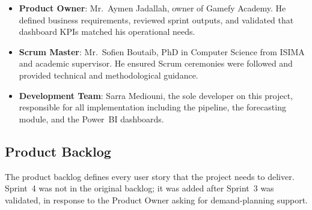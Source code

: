 \documentclass[12pt, a4paper]{report}
\begin{document}
\begin{itemize}
  \item \textbf{Product Owner}: Mr.\ Aymen Jadallah, owner of Gamefy Academy.
        He defined business requirements, reviewed sprint outputs, and validated
        that dashboard KPIs matched his operational needs.

  \item \textbf{Scrum Master}: Mr.\ Sofien Boutaib, PhD in Computer Science from
        ISIMA and academic supervisor. He ensured Scrum ceremonies were followed
        and provided technical and methodological guidance.

  \item \textbf{Development Team}: Sarra Mediouni, the sole developer on this
        project, responsible for all implementation including the pipeline, the
        forecasting module, and the Power~BI dashboards.
\end{itemize}

\subsection{Product Backlog}

The product backlog defines every user story that the project needs to deliver.
Sprint~4 was not in the original backlog; it was added after Sprint~3 was validated,
in response to the Product Owner asking for demand-planning support.
\end{document}
